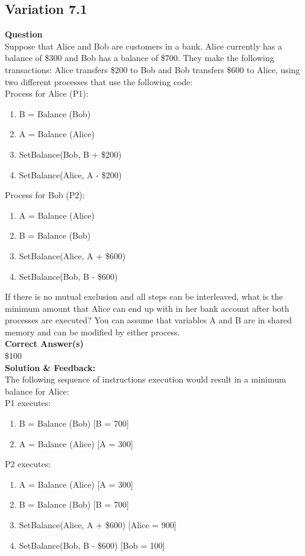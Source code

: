 \subsection{Variation 7.1}

\textbf{Question}\\
Suppose that Alice and Bob are customers in a bank. Alice currently has a balance of \$300 and Bob has a balance of \$700. They make the following transactions: Alice transfers \$200 to Bob and Bob transfers \$600 to Alice, using two different processes that use the following code:\\
Process for Alice (P1):
\begin{enumerate}
    \item B = Balance (Bob)
    \item A = Balance (Alice)
    \item SetBalance(Bob, B + \$200)
    \item SetBalance(Alice, A - \$200)
\end{enumerate}
Process for Bob (P2):\\
\begin{enumerate}
    \item A = Balance (Alice)
    \item B = Balance (Bob)
    \item SetBalance(Alice, A + \$600)
    \item SetBalance(Bob, B - \$600)
\end{enumerate}
If there is no mutual exclusion and all steps can be interleaved, what is the minimum amount that Alice can end up with in her bank account after both processes are executed? You can assume that variables A and B are in shared memory and can be modified by either process.\\
\textbf{Correct Answer(s)}\\
\$100\\
\textbf{Solution \& Feedback:}\\
The following sequence of instructions execution would result in a minimum balance for Alice:\\
P1 executes:\\
\begin{enumerate}
    \item B = Balance (Bob) [B = 700]
    \item A = Balance (Alice) [A = 300]
\end{enumerate}
P2 executes:\\
\begin{enumerate}
    \item A = Balance (Alice) [A = 300]
    \item B = Balance (Bob) [B = 700]
    \item SetBalance(Alice, A + \$600) [Alice = 900]
    \item SetBalance(Bob, B - \$600) [Bob = 100]
\end{enumerate}

